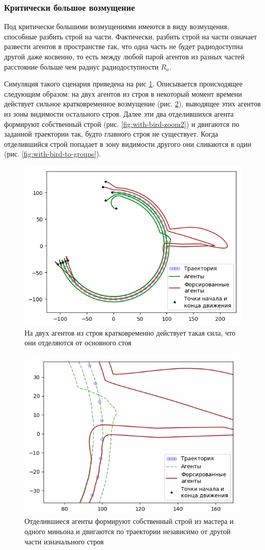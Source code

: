\documentclass[a4paper, 14pt]{extarticle}
\let\Oldsubsubsection\subsubsection
\renewcommand{\subsubsection}{\FloatBarrier\Oldsubsubsection}
\begin{document}
\subsubsection{Критически большое возмущение}
Под критически большими возмущениями имеются в виду возмущения, способные разбить строй на части. Фактически, разбить строй на части означает развести агентов в пространстве так, что одна часть не будет радиодоступна другой даже косвенно, то есть между любой парой агентов из разных частей расстояние больше чем радиус радиодоступности $R_a$. \par
Симуляция такого сценария приведена на рис \ref{fig:with-bird}. Описывается происходящее следующим образом: на двух агентов из строя в некоторый момент времени действует сильное кратковременное возмущение (рис.  \ref{fig:with-bird-zoom1}), выводящее этих агентов из зоны видимости остального строя. Далее эти два отделившихся агента формируют собственный строй (рис. \ref{fig:with-bird-zoom2}) и двигаются по заданной траектории так, будто главного строя не существует. Когда отделившийся строй попадает в зону видимости другого они сливаются в один (рис. \ref{fig:with-bird-to-groups}).
\begin{figure}
	\centering
	\includegraphics[width=0.7\linewidth]{platoon/with-bird}
	\caption{На двух агентов из строя кратковременно действует такая сила, что они отделяются от основного стоя}
	\label{fig:with-bird}
\end{figure}
\begin{figure}
	\centering
	\includegraphics[width=0.7\linewidth]{platoon/with-bird-zoom1}
	\caption{Отделившиеся агенты формируют собственный строй из мастера и одного миньона и двигаются по траектории независимо от другой части изначального строя}
	\label{fig:with-bird-zoom1}
\end{figure}
\end{document}
